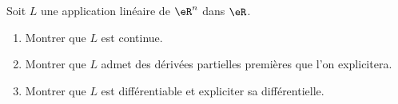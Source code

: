 \begin{exercice}[\minsyndical]\label{exoCalculDifferentiel0003}

Soit $L$ une application linéaire de $\eR ^n$ dans $\eR $.
\begin{enumerate}
	\item
Montrer que $L$ est continue.
\item
 Montrer que $L$ admet des dérivées partielles premières que l'on explicitera. 
 \item
 Montrer que $L$ est différentiable et expliciter sa différentielle.
		
\end{enumerate}

\end{exercice}
